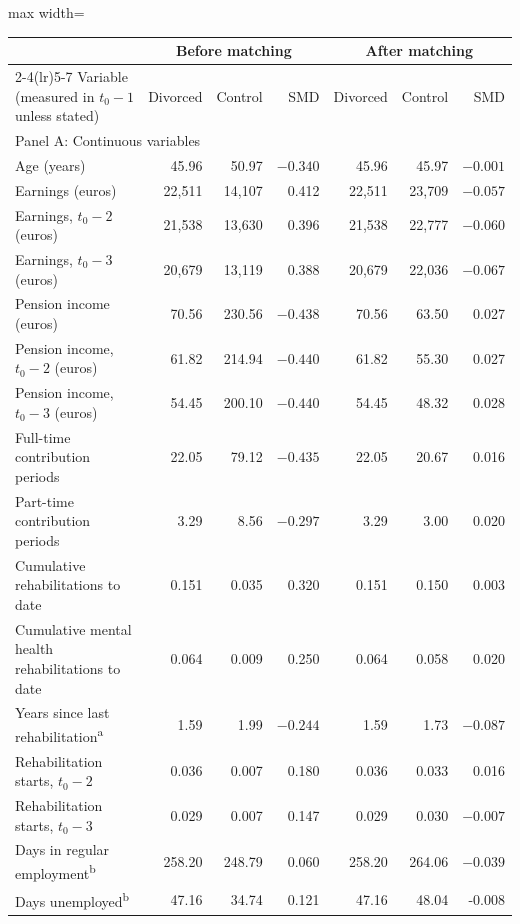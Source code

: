 \documentclass[a4paper,12pt]{article}
\theoremstyle{plain}
\theoremstyle{definition}
\theoremstyle{TheoremNum}
\theoremstyle{CorollaryNum}
\theoremstyle{PropositionNum}
\theoremstyle{TheoremNum}
\begin{document}
\begin{table}[H]
\centering
\scriptsize
\setlength{\tabcolsep}{3pt}
\begin{adjustbox}{max width=\textwidth}
\begin{tabular}{lrrrrrr}
\toprule
& \multicolumn{3}{c}{Before matching} & \multicolumn{3}{c}{After matching} \\
\cmidrule(lr){2-4}\cmidrule(lr){5-7}
Variable (measured in $t_0-1$ unless stated) & Divorced & Control & SMD & Divorced & Control & SMD \\
\midrule
\multicolumn{7}{l}{Panel A: Continuous variables} \\ \hline
Age (years) & 45.96 & 50.97 & $-0.340$ & 45.96 & 45.97 & $-0.001$ \\
Earnings (euros) & 22,511 & 14,107 & 0.412 & 22,511 & 23,709 & $-0.057$ \\
Earnings, $t_0-2$ (euros) & 21,538 & 13,630 & 0.396 & 21,538 & 22,777 & $-0.060$ \\
Earnings, $t_0-3$ (euros) & 20,679 & 13,119 & 0.388 & 20,679 & 22,036 & $-0.067$ \\
Pension income (euros) & 70.56 & 230.56 & $-0.438$ & 70.56 & 63.50 & 0.027 \\
Pension income, $t_0-2$ (euros) & 61.82 & 214.94 & $-0.440$ & 61.82 & 55.30 & 0.027 \\
Pension income, $t_0-3$ (euros) & 54.45 & 200.10 & $-0.440$ & 54.45 & 48.32 & 0.028 \\
Full-time contribution periods & 22.05 & 79.12 & $-0.435$ & 22.05 & 20.67 & 0.016 \\
Part-time contribution periods & 3.29 & 8.56 & $-0.297$ & 3.29 & 3.00 & 0.020 \\
Cumulative rehabilitations to date & 0.151 & 0.035 & 0.320 & 0.151 & 0.150 & 0.003 \\
Cumulative mental health rehabilitations to date & 0.064 & 0.009 & 0.250 & 0.064 & 0.058 & 0.020 \\
Years since last rehabilitation\textsuperscript{a} & 1.59 & 1.99 & $-0.244$ & 1.59 & 1.73 & $-0.087$ \\
Rehabilitation starts, $t_0-2$ & 0.036 & 0.007 & 0.180 & 0.036 & 0.033 & 0.016 \\
Rehabilitation starts, $t_0-3$ & 0.029 & 0.007 & 0.147 & 0.029 & 0.030 & $-0.007$ \\
Days in regular employment\textsuperscript{b} & 258.20 & 248.79 & 0.060 & 258.20 & 264.06 & $-0.039$ \\
Days unemployed\textsuperscript{b} & 47.16 & 34.74 & 0.121 & 47.16 & 48.04 & -0.008 \\

\end{tabular}
\end{adjustbox}
\end{table}
\end{document}
